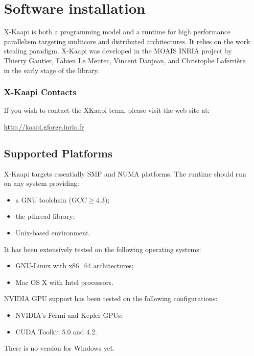 \documentclass{article}[12pt]
\newcommand{\kaapi}{\textsc{X}-Kaapi\xspace}
\begin{document}
\newpage
\section{Software installation}\label{sec:userinstall}

\kaapi is both a programming model and a runtime for high performance parallelism targeting multicore and distributed architectures. 
It relies on the work stealing paradigm.
\kaapi was developed in the MOAIS INRIA project by Thierry Gautier, Fabien Le Mentec, Vincent Danjean, and Christophe Laferrière in the early stage of the library.

\subsubsection*{\kaapi Contacts}
If you wish to contact the XKaapi team, please visit the web site at:
\begin{center}
\url{http://kaapi.gforge.inria.fr}
\end{center}

\subsection{Supported Platforms}

\kaapi targets essentially SMP and NUMA platforms. The runtime should run
on any system providing:
\begin{itemize}
\item a GNU toolchain ($\textrm{GCC} \ge 4.3$);
\item the pthread library;
\item Unix-based environment.
\end{itemize}
It has been extensively tested on the following operating systems:
\begin{itemize}
\item GNU-Linux with x86\_64 architectures;
\item Mac OS X with Intel processors.
\end{itemize}
NVIDIA GPU support has been tested on the following configurations:
\begin{itemize}
\item NVIDIA's Fermi and Kepler GPUs;
\item CUDA Toolkit 5.0 and 4.2.
\end{itemize}
There is no version for Windows yet.
\end{document}
